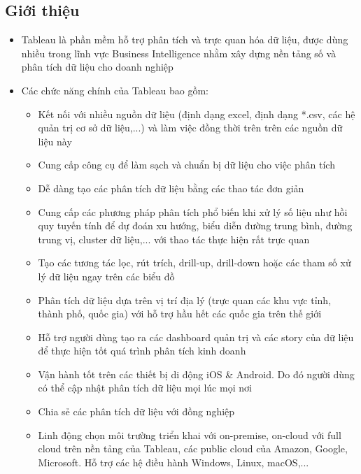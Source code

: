 \documentclass[a4paper, 12pt]{article}
\begin{document}
\subsection{Giới thiệu}

\begin{itemize}
    \item Tableau là phần mềm hỗ trợ phân tích và trực quan hóa dữ liệu, được dùng nhiều trong lĩnh vực Business Intelligence nhằm xây dựng nền tảng số và phân tích dữ liệu cho doanh nghiệp
    \item Các chức năng chính của Tableau bao gồm:
    \begin{itemize}
        \item Kết nối với nhiều nguồn dữ liệu (định dạng excel, định dạng *.csv, các hệ quản trị cơ sở dữ liệu,...) và làm việc đồng thời trên trên các nguồn dữ liệu này
        \item Cung cấp công cụ để làm sạch và chuẩn bị dữ liệu cho việc phân tích
        \item Dễ dàng tạo các phân tích dữ liệu bằng các thao tác đơn giản
        \item Cung cấp các phương pháp phân tích phổ biến khi xử lý số liệu như hồi quy tuyến tính để dự đoán xu hướng, biểu diễn đường trung bình, đường trung vị, cluster dữ liệu,... với thao tác thực hiện rất trực quan
        \item Tạo các tương tác lọc, rút trích, drill-up, drill-down hoặc các tham số xử lý dữ liệu ngay trên các biểu đồ
        \item Phân tích dữ liệu dựa trên vị trí địa lý (trực quan các khu vực tỉnh, thành phố, quốc gia) với hỗ trợ hầu hết các quốc gia trên thế giới
        \item Hỗ trợ người dùng tạo ra các dashboard quản trị và các story của dữ liệu để thực hiện tốt quá trình phân tích kinh doanh
        \item Vận hành tốt trên các thiết bị di động iOS \& Android. Do đó người dùng có thể cập nhật phân tích dữ liệu mọi lúc mọi nơi
        \item Chia sẻ các phân tích dữ liệu với đồng nghiệp
        \item Linh động chọn môi trường triển khai với on-premise, on-cloud với full cloud trên nền tảng của Tableau, các public cloud của Amazon, Google, Microsoft. Hỗ trợ các hệ điều hành Windows, Linux, macOS,...
    \end{itemize}


\end{itemize}
\end{document}
